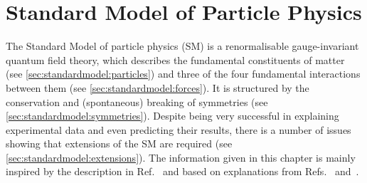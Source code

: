 
\chapter{Standard Model of Particle Physics}
\label{sec:standardmodel}

The Standard Model of particle physics (SM) is a renormalisable
gauge-invariant quantum field theory, which describes the fundamental
constituents of matter (see \cref{sec:standardmodel:particles}) and three of
the four fundamental interactions between them (see
\cref{sec:standardmodel:forces}). It is structured by the conservation
and (spontaneous) breaking of symmetries (see
\cref{sec:standardmodel:symmetries}). Despite being very successful in
explaining experimental data and even predicting their results, there is a
number of issues showing that extensions of the SM are required (see
\cref{sec:standardmodel:extensions}). The information given in this chapter is
mainly inspired by the description in Ref.~\cite{Brock:2011zz} and based on
explanations from Refs.~\cite{Griffiths:2008zz} and~\cite{Perkins:1982xb}.







